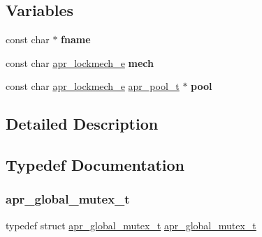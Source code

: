 \subsection*{Variables}
\begin{DoxyCompactItemize}
\item 
\mbox{\label{group___a_p_r___global_mutex_ga6a2fc0c236288b07ce5bd1335ca89fa2}} 
const char $\ast$ {\bfseries fname}
\item 
\mbox{\label{group___a_p_r___global_mutex_gac5f6e658672b8579da569b97a6ae82a2}} 
const char \mbox{\hyperlink{group__apr__proc__mutex_ga75dd95a48a1e855a87b509b522746ed4}{apr\+\_\+lockmech\+\_\+e}} {\bfseries mech}
\item 
\mbox{\label{group___a_p_r___global_mutex_ga51fbc0d90e2519e2e42e03c5dd9f441b}} 
const char \mbox{\hyperlink{group__apr__proc__mutex_ga75dd95a48a1e855a87b509b522746ed4}{apr\+\_\+lockmech\+\_\+e}} \mbox{\hyperlink{group__apr__pools_gaf137f28edcf9a086cd6bc36c20d7cdfb}{apr\+\_\+pool\+\_\+t}} $\ast$ {\bfseries pool}
\end{DoxyCompactItemize}


\subsection{Detailed Description}


\subsection{Typedef Documentation}
\mbox{\label{group___a_p_r___global_mutex_ga3fc7dc5b076533ee566aa4888ac35ee7}} 
\subsubsection{\texorpdfstring{apr\+\_\+global\+\_\+mutex\+\_\+t}{apr\_global\_mutex\_t}}
{\footnotesize\ttfamily typedef struct \mbox{\hyperlink{structapr__global__mutex__t}{apr\+\_\+global\+\_\+mutex\+\_\+t}} \mbox{\hyperlink{structapr__global__mutex__t}{apr\+\_\+global\+\_\+mutex\+\_\+t}}}

